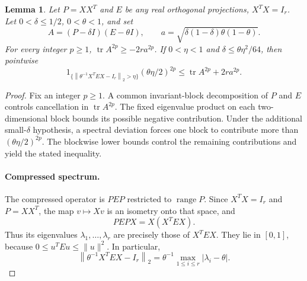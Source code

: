 \documentclass[11pt]{article}
\newtheorem{lemma}[theorem]{Lemma}
\theoremstyle{definition}
\theoremstyle{remark}
\theoremstyle{plain}
\DeclareMathOperator{\tr}{tr}
\newcommand{\norm}[1]{\left\lVert#1\right\rVert_2}
\begin{document}
\begin{lemma}\label{lem:transfer}
Let \(P=XX^T\) and \(E\) be any real orthogonal projections,
\(X^TX=I_r\). Let \(0<\delta\le1/2\), \(0<\theta<1\), and set
\[
 A=(P-\delta I)(E-\theta I),\qquad
 a=\sqrt{\delta(1-\delta)\theta(1-\theta)}.
\]
For every integer \(p\ge1\), \(\tr A^{2p}\ge-2r a^{2p}\).
If \(0<\eta<1\) and \(\delta\le\theta\eta^2/64\), then pointwise
\begin{equation}\label{eq:spectral-transfer}
 1_{\{\norm{\theta^{-1}X^TEX-I_r}>\eta\}}
          (\theta\eta/2)^{2p}
                \le\tr A^{2p}+2r a^{2p}.
\end{equation}
\end{lemma}
\begin{proof}
Fix an integer \(p\ge1\). A common invariant-block
decomposition of \(P\) and \(E\) controls cancellation in
\(\tr A^{2p}\). The fixed eigenvalue product on each
two-dimensional block bounds its possible negative contribution.
Under the additional small-\(\delta\) hypothesis, a spectral
deviation forces one block to contribute more than
\((\theta\eta/2)^{2p}\). The blockwise lower bounds control the
remaining contributions and yield the stated inequality.

\paragraph{Compressed spectrum.}
The compressed operator is \(PEP\) restricted to
\(\operatorname{range}P\). Since \(X^TX=I_r\) and \(P=XX^T\),
the map \(v\mapsto Xv\) is an isometry onto that space, and
\[
 PEPX=X(X^TEX).
\]
Thus its eigenvalues \(\lambda_1,\ldots,\lambda_r\) are precisely
those of \(X^TEX\). They lie in \([0,1]\), because
\(0\le u^TEu\le\|u\|^2\). In particular,
\[
 \norm{\theta^{-1}X^TEX-I_r}
       =\theta^{-1}\max_{1\le i\le r}|\lambda_i-\theta|.
\]


\end{proof}
\end{document}
